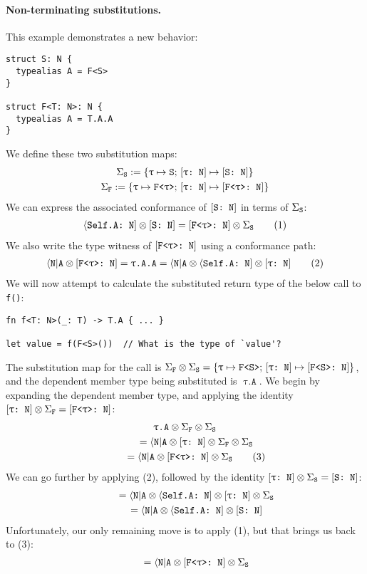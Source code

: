 \documentclass[../generics]{subfiles}
\begin{document}
\paragraph{Non-terminating substitutions.}
This example demonstrates a new behavior:
\begin{Verbatim}
struct S: N {
  typealias A = F<S>
}

struct F<T: N>: N {
  typealias A = T.A.A
}
\end{Verbatim}
We define these two substitution maps:
\begin{gather*} \Sigma_\texttt{S}:=\{\texttt{$\uptau$} \mapsto \texttt{S};\,[\texttt{$\uptau$:~N}] \mapsto [\texttt{S:~N}]\}\\
\Sigma_\texttt{F} := \{\texttt{$\uptau$} \mapsto \texttt{F<$\uptau$>};\,[\texttt{$\uptau$:~N}] \mapsto [\texttt{F<$\uptau$>:~N}]\}
\end{gather*}
We can express the associated conformance of $[\texttt{S:~N}]$ in terms of $\Sigma_\texttt{S}$:
\begin{gather*}
\langle\texttt{Self.A:~N}] \otimes [\texttt{S:~N}] = [\texttt{F<$\uptau$>:~N}]\otimes \Sigma_\texttt{S} \tag{1}
\end{gather*}
We also write the type witness of $[\texttt{F<$\uptau$>:~N}]$ using a conformance path:
\begin{gather*}
\langle\texttt{N}|\texttt{A} \otimes [\texttt{F<$\uptau$>:~N}] = \texttt{$\uptau$.A.A} = \langle\texttt{N}|\texttt{A} \otimes \langle\texttt{Self.A:~N}] \otimes [\texttt{$\uptau$:~N}] \tag{2}
\end{gather*}
We will now attempt to calculate the substituted return type of the below call to \verb|f()|:
\begin{Verbatim}
fn f<T: N>(_: T) -> T.A { ... }

let value = f(F<S>())  // What is the type of `value'?
\end{Verbatim}
The substitution map for the call is $\Sigma_\texttt{F} \otimes \Sigma_\texttt{S} = \{\texttt{$\uptau$} \mapsto \texttt{F<S>};\,[\texttt{$\uptau$:~N}] \mapsto [\texttt{F<S>:~N}]\}$, and the dependent member type being substituted is $\texttt{$\uptau$.A}$. We begin by expanding the dependent member type, and applying the identity $[\texttt{$\uptau$:~N}] \otimes \Sigma_\texttt{F} = [\texttt{F<$\uptau$>:~N}]$:
\begin{gather*}
\texttt{$\uptau$.A} \otimes \Sigma_\texttt{F}\otimes\Sigma_\texttt{S} \\
\qquad {} = \langle\texttt{N}|\texttt{A} \otimes [\texttt{$\uptau$:~N}] \otimes \Sigma_\texttt{F}\otimes\Sigma_\texttt{S}\\
\qquad {} = \langle\texttt{N}|\texttt{A} \otimes [\texttt{F<$\uptau$>:~N}] \otimes \Sigma_\texttt{S} \tag{3}
\end{gather*}
We can go further by applying (2), followed by the identity $[\texttt{$\uptau$:~N}] \otimes \Sigma_\texttt{S}=[\texttt{S:~N}]$:
\begin{gather*}
\qquad {} = \langle\texttt{N}|\texttt{A} \otimes \langle\texttt{Self.A:~N}] \otimes [\texttt{$\uptau$:~N}] \otimes \Sigma_\texttt{S}\\
\qquad {} = \langle\texttt{N}|\texttt{A} \otimes \langle\texttt{Self.A:~N}] \otimes [\texttt{S:~N}]
\end{gather*}
Unfortunately, our only remaining move is to apply (1), but that brings us back to (3):
\begin{gather*}
\qquad {} = \langle\texttt{N}|\texttt{A} \otimes [\texttt{F<$\uptau$>:~N}] \otimes \Sigma_\texttt{S}
\end{gather*}
\end{document}
